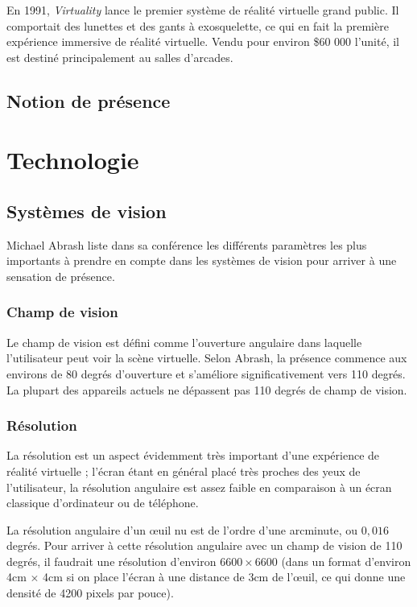 \documentclass[a4]{scrartcl}
\begin{document}
En 1991, \emph{Virtuality} lance le premier système de réalité virtuelle grand public. Il comportait des lunettes et des gants à exosquelette, ce qui en fait la première expérience immersive de réalité virtuelle. Vendu pour environ \$60 000 l'unité, il est destiné principalement au salles d'arcades.

\subsection{Notion de présence}


\section{Technologie}


\subsection{Systèmes de vision}

Michael Abrash liste dans sa conférence \cite{Abrash14} les différents paramètres les plus importants à prendre en compte dans les systèmes de vision pour arriver à une sensation de présence.

\subsubsection{Champ de vision}

Le champ de vision est défini comme l'ouverture angulaire dans laquelle l'utilisateur peut voir la scène virtuelle. Selon Abrash, la présence commence aux environs de 80 degrés d'ouverture et s'améliore significativement vers 110 degrés. La plupart des appareils actuels ne dépassent pas 110 degrés de champ de vision.

\subsubsection{Résolution}

La résolution est un aspect évidemment très important d'une expérience de réalité virtuelle ; l'écran étant en général placé très proches des yeux de l'utilisateur, la résolution angulaire est assez faible en comparaison à un écran classique d'ordinateur ou de téléphone.

La résolution angulaire d'un \oe{}uil nu est de l'ordre d'une arcminute, ou $0,016$ degrés. Pour arriver à cette résolution angulaire avec un champ de vision de 110 degrés, il faudrait une résolution d'environ $6600 \times 6600$ (dans un format d'environ 4cm $\times$ 4cm si on place l'écran à une distance de 3cm de l'\oe{}uil, ce qui donne une densité de 4200 pixels par pouce).
\end{document}
